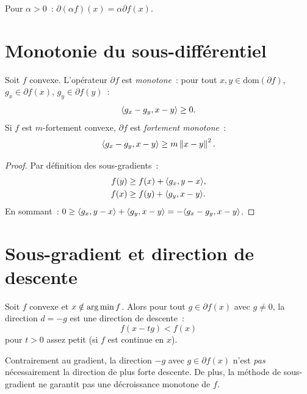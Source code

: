 \begin{proposition}
Pour $\alpha > 0$~: $\partial(\alpha f)(x) = \alpha \partial f(x)$.
\end{proposition}

\section{Monotonie du sous-diff\'erentiel}

\begin{theoreme}[Monotonie]
\label{thm:monotonie}
Soit $f$ convexe. L'op\'erateur $\partial f$ est \emph{monotone}~:
pour tout $x, y \in \mathrm{dom}(\partial f)$, $g_x \in \partial f(x)$,
$g_y \in \partial f(y)$~:
\[
    \langle g_x - g_y, x - y \rangle \geq 0.
\]
Si $f$ est $m$-fortement convexe, $\partial f$ est \emph{fortement monotone}~:
\[
    \langle g_x - g_y, x - y \rangle \geq m\left\| x - y \right\|^2.
\]
\end{theoreme}

\begin{proof}
Par d\'efinition des sous-gradients~:
\begin{align*}
    f(y) &\geq f(x) + \langle g_x, y - x \rangle, \\
    f(x) &\geq f(y) + \langle g_y, x - y \rangle.
\end{align*}
En sommant~: $0 \geq \langle g_x, y-x \rangle + \langle g_y, x-y \rangle = -\langle g_x - g_y, x-y \rangle$.
\end{proof}

\section{Sous-gradient et direction de descente}

\begin{proposition}
Soit $f$ convexe et $x \notin \operatorname*{arg\,min} f$. Alors pour tout $g \in \partial f(x)$
avec $g \neq 0$, la direction $d = -g$ est une direction de descente~:
\[
    f(x - tg) < f(x)
\]
pour $t > 0$ assez petit (si $f$ est continue en $x$).
\end{proposition}

\begin{attention}[title=\textbf{Sous-gradient vs gradient}]
Contrairement au gradient, la direction $-g$ avec $g \in \partial f(x)$ n'est
\emph{pas} n\'ecessairement la direction de plus forte descente. De plus, la m\'ethode
de sous-gradient ne garantit pas une d\'ecroissance monotone de $f$.
\end{attention}

